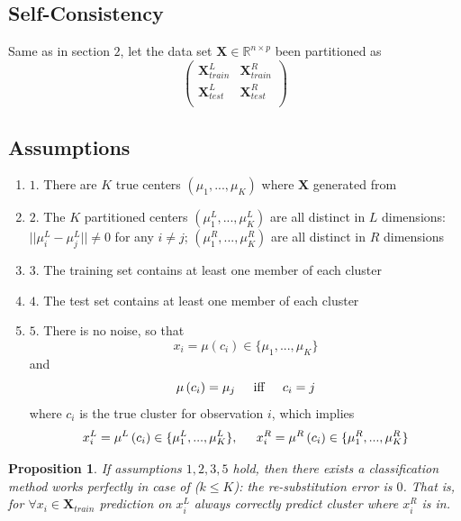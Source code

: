 \documentclass[11pt]{article}
\newtheorem{proposition}{Proposition}
\begin{document}
\subsection{Self-Consistency}
Same as in section $2$, let the data set $\mathbf{X} \in \mathbb{R}^{n \times p}$ been partitioned as 
 \[ 
 \begin{pmatrix}
\mathbf{X}^L_{train} & \mathbf{X}^R_{train}\\
  \mathbf{X}^L_{test}  & \mathbf{X}^R_{test}\\
  \end{pmatrix}
 \]
\subsection*{Assumptions}
\begin{enumerate}[label={Assumption},leftmargin=*]
\item $1.$ There are $K$ true centers $(\mu_1,...,\mu_K)$ where $\mathbf{X}$ generated from
\item $2.$ The $K$ partitioned centers $(\mu^L_1,...,\mu^L_K)$ are all distinct in $L$ dimensions: $||\mu^L_i-\mu^L_j|| \neq 0$ for any $i \neq j$; $(\mu^R_1,...,\mu^R_K)$ are all distinct in $R$ dimensions
\item $3.$ The training set contains at least one member of each cluster
\item $4.$ The test set contains at least one member of each cluster
\item $5.$ There is no noise, so that $$x_i = \mu \left(c_i\right) \in \{\mu_1,...,\mu_K\} $$ and $$\mu \left(c_i\right) = \mu_j \hspace{0.2in} \text{iff} \hspace{0.2in} c_i = j$$ where $c_i$ is the true cluster for observation $i$, which implies $$x^L_i = \mu^L\left(c_i\right) \in \{\mu^L_1,...,\mu^L_K\},\hspace{0.2in} x^R_i = \mu^R\left(c_i\right) \in \{\mu^R_1,...,\mu^R_K\}$$
\end{enumerate}
 
\begin{proposition}
	If assumptions $1, 2, 3, 5$ hold, then there exists a classification method works perfectly in case of ($k \leq K$): the re-substitution error is $0$. That is, for $\forall x_i \in \mathbf{X}_{train}$ prediction on $x^L_i$ always correctly predict cluster where $x^R_i$ is in.
\end{proposition}
\end{document}
